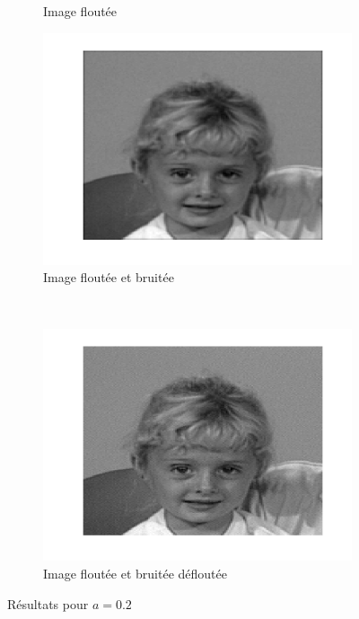 \begin{figure}
\begin{subfigure}[b]{0.45\textwidth}
    \caption{Image floutée}
    \label{fig:a2blurred}
  \end{subfigure}
  \begin{subfigure}[b]{0.45\textwidth}
    \includegraphics[width=\textwidth]{Q2/noise_20.png}
    \caption{Image floutée et bruitée}
    \label{fig:a2noise}
  \end{subfigure}%
  ~
  \begin{subfigure}[b]{0.45\textwidth}
    \includegraphics[width=\textwidth]{Q2/unblurred_20.png}
    \caption{Image floutée et bruitée défloutée}
    \label{fig:a2unblurred}
  \end{subfigure}
  \caption{Résultats pour $a = 0.2$}\label{fig:a2}
\end{figure}

